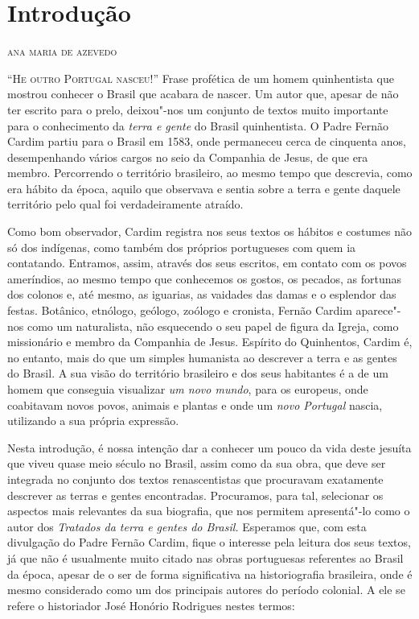 \chapter[Introdução, \emph{por Ana Maria de Azevedo}]{Introdução}

\begin{flushright}
\textsc{ana maria de azevedo}
\end{flushright}

\textsc{``He outro Portugal nasceu!''} Frase profética de um homem quinhentista que mostrou conhecer o
Brasil que acabara de nascer. Um autor que, apesar de não ter escrito
para o prelo, deixou"-nos um conjunto de textos muito importante para o
conhecimento da \textit{terra e gente} do Brasil quinhentista. O Padre
Fernão Cardim partiu para o Brasil em 1583, onde permaneceu cerca de
cinquenta anos, desempenhando vários cargos no seio da Companhia de
Jesus, de que era membro. Percorrendo o território brasileiro, ao mesmo
tempo que descrevia, como era hábito da época, aquilo que observava e
sentia sobre a terra e gente daquele território pelo qual foi
verdadeiramente atraído. 

Como bom observador, Cardim registra nos seus textos os hábitos e
costumes não só dos indígenas, como também dos próprios portugueses
com quem ia contatando. Entramos, assim, através dos seus escritos, em
contato com os povos ameríndios, ao mesmo tempo que conhecemos os
gostos, os pecados, as fortunas dos colonos e, até mesmo, as iguarias,
as vaidades das damas e o esplendor das festas. Botânico, etnólogo,
geólogo, zoólogo e cronista, Fernão Cardim aparece"-nos como um
naturalista, não esquecendo o seu papel de figura da Igreja, como
missionário e membro da Companhia de Jesus. Espírito do Quinhentos,
Cardim é, no entanto, mais do que um simples humanista ao descrever a
terra e as gentes do Brasil. A sua visão do território brasileiro e dos
seus habitantes é a de um homem que conseguia visualizar \textit{um
novo mundo}, para os europeus, onde coabitavam novos povos,
animais e plantas e onde um \textit{novo Portugal} nascia, utilizando a
sua própria expressão.

Nesta introdução, é nossa intenção dar a conhecer um pouco da vida
deste jesuíta que viveu quase meio século no Brasil, assim como da sua
obra, que deve ser integrada no conjunto dos textos renascentistas que
procuravam exatamente descrever as terras e gentes encontradas.
Procuramos, para tal, selecionar os aspectos mais relevantes da sua
biografia, que nos permitem apresentá"-lo como o autor dos
\textit{Tratados da terra e gentes do Brasil.} Esperamos que, com esta
divulgação do Padre Fernão Cardim, fique o interesse pela leitura dos
seus textos, já que não é usualmente muito citado nas obras portuguesas
referentes ao Brasil da época, apesar de o ser de forma significativa
na historiografia brasileira, onde é mesmo considerado como um dos
principais autores do período colonial. A ele se refere o historiador
José Honório Rodrigues nestes termos:

